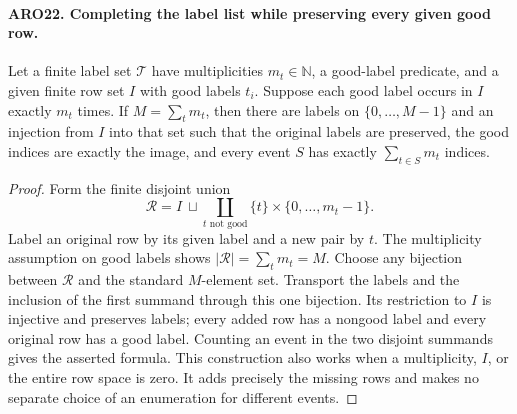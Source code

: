 \paragraph{ARO22. Completing the label list while preserving every given good row.}
\label{claim:ARO22}
Let a finite label set \(\mathcal T\) have multiplicities
\(m_t\in\mathbb N\), a good-label predicate, and a given finite
row set \(I\) with good labels \(t_i\).  Suppose each good label
occurs in \(I\) exactly \(m_t\) times.  If
\(M=\sum_tm_t\), then there are labels on \(\{0,\ldots,M-1\}\)
and an injection from \(I\) into that set such that the original
labels are preserved, the good indices are exactly the image, and
every event \(S\) has exactly \(\sum_{t\in S}m_t\) indices.
\begin{proof}
Form the finite disjoint union
\[
                \mathcal R=I\ \sqcup\!
                  \coprod_{t\text{ not good}}\{t\}\times\{0,\ldots,m_t-1\}.
 \tag{ARO.25}
\]
Label an original row by its given label and a new pair by \(t\).
The multiplicity assumption on good labels shows
\(|\mathcal R|=\sum_tm_t=M\).  Choose any bijection between
\(\mathcal R\) and the standard \(M\)-element set.  Transport the
labels and the inclusion of the first summand through this one
bijection.  Its restriction to \(I\) is injective and preserves
labels; every added row has a nongood label and every original
row has a good label.  Counting an event in the two disjoint
summands gives the asserted formula.  This construction also works
when a multiplicity, \(I\), or the entire row space is zero.
It adds precisely the missing rows and makes no separate choice
of an enumeration for different events.
\end{proof}

